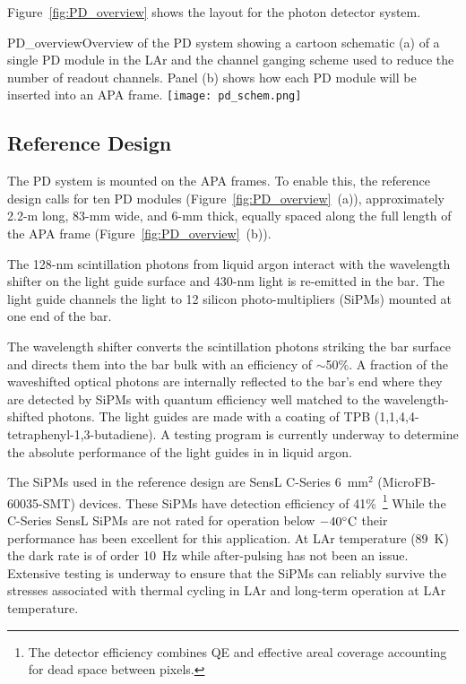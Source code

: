 Figure~\ref{fig:PD_overview} shows the layout for the photon
detector system. %

\begin{cdrfigure}[PD Overview]{PD_overview}{Overview of the PD
    system showing a cartoon schematic (a) of a single PD module
    in the LAr and the channel ganging scheme used to reduce the
    number of readout channels. Panel (b) shows how each PD module
    will be inserted into an APA frame. }
\texttt{[image: pd\_schem.png]}
\end{cdrfigure}

\subsection{Reference Design}
\label{sec:detectors-fd-ref-pd-refsystem}   %

The PD system is mounted on the APA frames. 
To enable this, the reference design %
calls for
ten PD modules (Figure~\ref{fig:PD_overview}~(a)), approximately 2.2-m long, 83-mm wide, and 6-mm thick,
equally spaced along the full length of the APA frame
(Figure~\ref{fig:PD_overview}~(b)). 

The 128-nm scintillation photons from liquid argon interact with the
wavelength shifter on the light guide surface and 430-nm light is
re-emitted in the bar. The light guide channels the light to
12 silicon photo-multipliers (SiPMs) mounted at one end of the bar.

The wavelength shifter converts the scintillation photons striking the
bar surface and directs them into the bar bulk with an efficiency of
$\sim$50\%.  A fraction of the waveshifted optical photons are
internally reflected to the bar's end where they are detected by SiPMs
with quantum efficiency well matched to the wavelength-shifted
photons. The light guides are made with a coating of TPB
(1,1,4,4-tetraphenyl-1,3-butadiene). A testing program is currently
underway to determine the absolute performance of the light guides in
in liquid argon.

The SiPMs used in the reference design are SensL C-Series 6~mm$^2$
(MicroFB-60035-SMT) devices. These SiPMs have detection efficiency of
41\%~\footnote{The detector efficiency combines QE and effective areal
  coverage accounting for dead space between pixels.} While the C-Series SensL
SiPMs are not rated for operation below $-40^{\circ}{\rm C}$ their
performance has been excellent for this application. At LAr
temperature (89~K) the dark rate is of order 10~Hz while after-pulsing
has not been an issue. Extensive testing is underway to ensure that
the SiPMs can reliably survive the stresses associated with thermal
cycling in LAr and long-term operation at LAr temperature.


